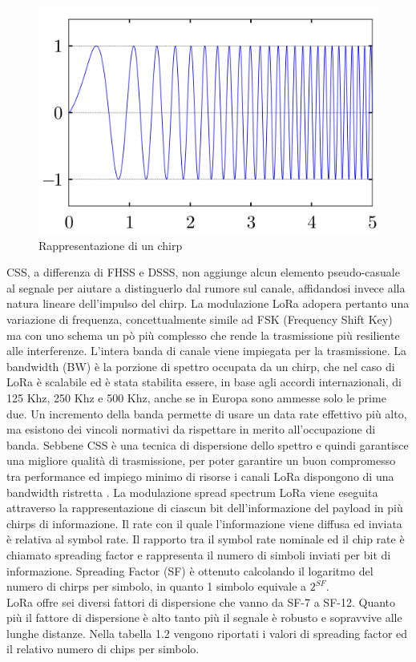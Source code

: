 \documentclass[12pt,a4paper,openright,twoside]{report}
\begin{document}
\begin{figure}[h]                      
\begin{center} 
\includegraphics[width=\textwidth]{chirp_signal.png}
\caption[Rappresentazione di un chirp]{Rappresentazione di un chirp}\label{fig:tredicesima}
\end{center}
\end{figure}
CSS, a differenza di FHSS e DSSS, non aggiunge alcun elemento pseudo-casuale al segnale per aiutare a distinguerlo dal rumore sul canale, affidandosi invece alla natura lineare dell'impulso del chirp.  
La modulazione LoRa adopera pertanto una variazione di frequenza, concettualmente simile ad FSK (Frequency Shift Key) ma con uno schema un p\`o pi\`u complesso che rende la trasmissione pi\`u resiliente alle interferenze. L'intera banda di canale viene impiegata per la trasmissione. 
La bandwidth (BW) \`e la porzione di spettro occupata da un chirp, che nel caso di LoRa \`e scalabile ed \`e stata stabilita essere, in base agli accordi internazionali, di 125 Khz, 250 Khz e 500 Khz, anche se in Europa sono ammesse solo le prime due. Un incremento della banda permette di usare un data rate effettivo pi\`u alto, ma esistono dei vincoli normativi da rispettare in merito all'occupazione di banda.
Sebbene CSS \`e una tecnica di dispersione dello spettro e quindi garantisce una migliore qualit\`a di trasmissione, per poter garantire un buon compromesso tra performance ed impiego minimo di risorse i canali LoRa dispongono di una bandwidth ristretta \cite{K21}.
La modulazione spread spectrum LoRa viene eseguita attraverso la rappresentazione di ciascun bit dell'informazione del payload in pi\`u chirps di informazione. Il rate con il quale l'informazione viene diffusa ed inviata \`e relativa al symbol rate. Il rapporto tra il symbol rate nominale ed il chip rate \`e chiamato spreading factor e rappresenta il numero di simboli inviati per bit di informazione.  
Spreading Factor (SF) \`e ottenuto calcolando il logaritmo del numero di chirps per simbolo, in quanto 1 simbolo equivale a $2^{SF}$.
\\LoRa offre sei diversi fattori di dispersione che vanno da SF-7 a SF-12. Quanto pi\`u il fattore di dispersione \`e alto tanto pi\`u il segnale \`e robusto e sopravvive alle lunghe distanze.
Nella tabella 1.2 vengono riportati i valori di spreading factor ed il relativo numero di chips per simbolo.
\end{document}
